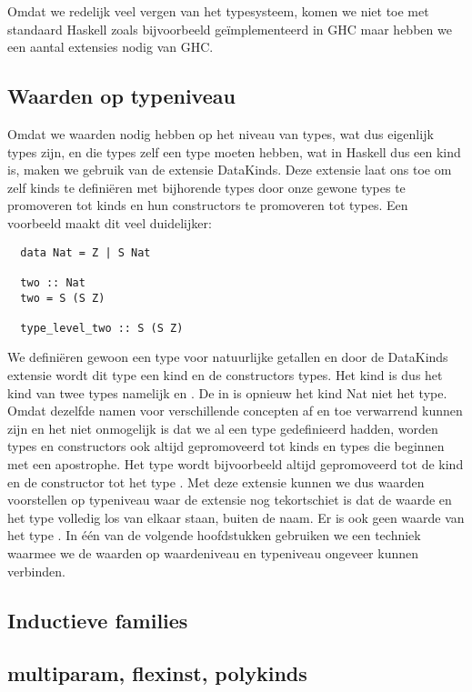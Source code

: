 Omdat we redelijk veel vergen van het typesysteem, komen we niet toe met
standaard Haskell zoals bijvoorbeeld geïmplementeerd in GHC maar hebben we een
aantal extensies nodig van GHC.

\subsection{Waarden op typeniveau}

Omdat we waarden nodig hebben op het niveau van types, wat dus eigenlijk types
zijn, en die types zelf een type moeten hebben, wat in Haskell dus een kind is,
maken we gebruik van de extensie DataKinds. Deze extensie laat ons toe om zelf
kinds te definiëren met bijhorende types door onze gewone types te promoveren
tot kinds en hun constructors te promoveren tot types. Een voorbeeld maakt dit
veel duidelijker:

\begin{verbatim}
  data Nat = Z | S Nat

  two :: Nat
  two = S (S Z)

  type_level_two :: S (S Z)
\end{verbatim}

We definiëren gewoon een type voor natuurlijke getallen en door de DataKinds
extensie wordt dit type een kind en de constructors types. Het kind 
is dus het kind van twee types namelijk  en . De
 in  is opnieuw het kind Nat niet het type. Omdat
dezelfde namen voor verschillende concepten af en toe verwarrend kunnen zijn en
het niet onmogelijk is dat we al een type  gedefinieerd hadden, worden
types en constructors ook altijd gepromoveerd tot kinds en types die beginnen
met een apostrophe. Het type  wordt bijvoorbeeld altijd gepromoveerd
tot de kind  en de constructor  tot het type .
Met deze extensie kunnen we dus waarden voorstellen op typeniveau waar de
extensie nog tekortschiet is dat de waarde  en het type 
volledig los van elkaar staan, buiten de naam. Er is ook geen waarde van het
type . In één van de volgende hoofdstukken gebruiken we een techniek
waarmee we de waarden op waardeniveau en typeniveau ongeveer kunnen verbinden.

\subsection{Inductieve families}

\subsection{multiparam, flexinst, polykinds}


